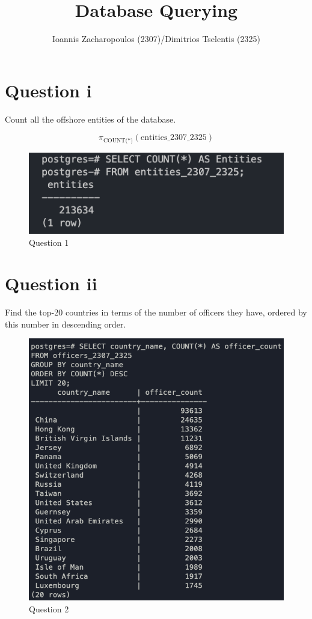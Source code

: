 \documentclass{article}
\title{Database Querying}
\author{Ioannis Zacharopoulos (2307)/Dimitrios Tselentis (2325)}
\begin{document}
\maketitle

\section*{Question i}
Count all the offshore entities of the database.


\[ \pi_{\text{{COUNT(*)}}}(\text{{entities\_2307\_2325}}) \]


\begin{figure}[h]
    \centering
    \includegraphics[width=0.6\linewidth]{Q1.png}
    \captionsetup{labelformat=empty}
    \caption{Question 1}
\end{figure}



\newpage

\section*{Question ii}
Find the top-20 countries in terms of the number of officers they have, ordered by this number in descending order.

\begin{figure}[h]
    \centering
    \includegraphics[width=0.9\linewidth]{Q2.png}
    \captionsetup{labelformat=empty}
    \caption{Question 2}
\end{figure}
\end{document}

